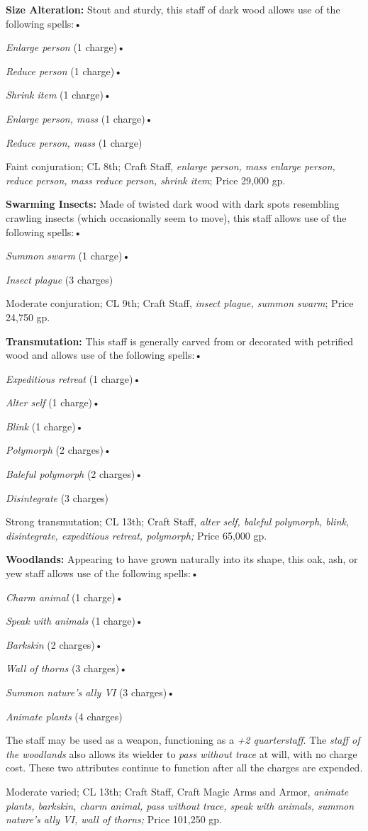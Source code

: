 \textbf{Size Alteration:} Stout and sturdy, this staff of dark wood allows use 
of the following spells:•

\textit{Enlarge person }(1 charge)•

\textit{Reduce person }(1 charge)•

\textit{Shrink item }(1 charge)•

\textit{Enlarge person, mass }(1 charge)•

\textit{Reduce person, mass }(1 charge)

Faint conjuration; CL 8th; Craft Staff, \textit{enlarge person, mass enlarge person, 
reduce person, mass reduce person, shrink item}; Price 29,000 gp.

\textbf{Swarming Insects:} Made of twisted dark wood with dark spots resembling 
crawling insects (which occasionally seem to move), this staff allows use of the 
following spells:•

\textit{Summon swarm }(1 charge)•

\textit{Insect plague }(3 charges)

Moderate conjuration; CL 9th; Craft Staff, \textit{insect plague, summon swarm}; 
Price 24,750 gp.

\textbf{Transmutation:} This staff is generally carved from or decorated with petrified 
wood and allows use of the following spells:•

\textit{Expeditious retreat }(1 charge)•

\textit{Alter self }(1 charge)•

\textit{Blink }(1 charge)•

\textit{Polymorph }(2 charges)•

\textit{Baleful polymorph }(2 charges)•

\textit{Disintegrate }(3 charges)

Strong transmutation; CL 13th; Craft Staff, \textit{alter self, baleful polymorph, 
blink, disintegrate, expeditious retreat, polymorph; }Price 65,000 gp.

\textbf{Woodlands:} Appearing to have grown naturally into its shape, this oak, 
ash, or yew staff allows use of the following spells:•

\textit{Charm animal }(1 charge)•

\textit{Speak with animals }(1 charge)•

\textit{Barkskin }(2 charges)•

\textit{Wall of thorns }(3 charges)•

\textit{Summon nature's ally VI }(3 charges)•

\textit{Animate plants }(4 charges)

The staff may be used as a weapon, functioning as a \textit{+2 quarterstaff}. The 
\textit{staff of the woodlands }also allows its wielder to \textit{pass without 
trace }at will, with no charge cost. These two attributes continue to function 
after all the charges are expended.

Moderate varied; CL 13th; Craft Staff, Craft Magic Arms and Armor, \textit{animate 
plants, barkskin, charm animal, pass without trace, speak with animals, summon 
nature's ally VI, wall of thorns; }Price 101,250 gp.
